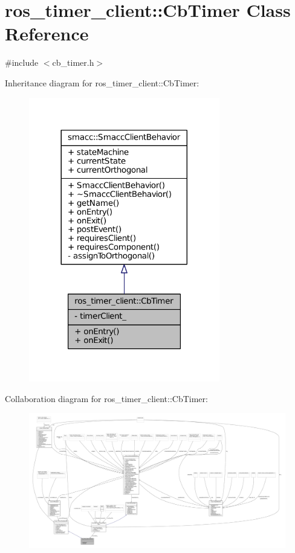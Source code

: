 \hypertarget{classros__timer__client_1_1CbTimer}{}\section{ros\+\_\+timer\+\_\+client\+:\+:Cb\+Timer Class Reference}
\label{classros__timer__client_1_1CbTimer}


{\ttfamily \#include $<$cb\+\_\+timer.\+h$>$}



Inheritance diagram for ros\+\_\+timer\+\_\+client\+:\+:Cb\+Timer\+:
\nopagebreak
\begin{figure}[H]
\begin{center}
\leavevmode
\includegraphics[width=236pt]{classros__timer__client_1_1CbTimer__inherit__graph}
\end{center}
\end{figure}


Collaboration diagram for ros\+\_\+timer\+\_\+client\+:\+:Cb\+Timer\+:
\nopagebreak
\begin{figure}[H]
\begin{center}
\leavevmode
\includegraphics[width=350pt]{classros__timer__client_1_1CbTimer__coll__graph}
\end{center}
\end{figure}
